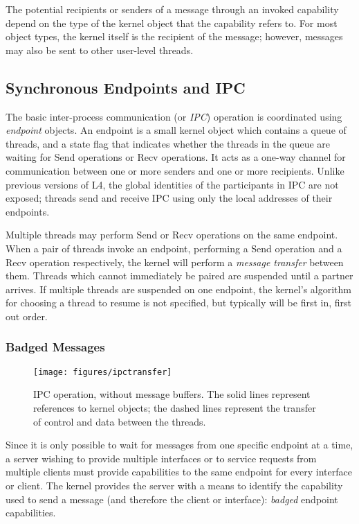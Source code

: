 The potential recipients or senders of a message through an invoked capability
depend on the type of the kernel object that the capability refers to. For
most object types, the kernel itself is the recipient of the message; however,
messages may also be sent to other user-level threads.

\subsection{Synchronous Endpoints and IPC}\label{sec:overview.caps.ipc}

The basic inter-process communication (or \emph{IPC}) operation is coordinated
using \emph{endpoint} objects. An endpoint is a small kernel object which
contains a queue of threads, and a state flag that indicates whether the
threads in the queue are waiting for Send operations or Recv operations. It
acts as a one-way channel for communication between one or more senders and
one or more recipients. Unlike previous versions of L4, the global identities
of the participants in IPC are not exposed; threads send and receive IPC using
only the local addresses of their endpoints.

Multiple threads may perform Send or Recv operations on the same endpoint.
When a pair of threads invoke an endpoint, performing a Send operation and a
Recv operation respectively, the kernel will perform a \emph{message transfer}
between them. Threads which cannot immediately be paired are suspended until a
partner arrives. If multiple threads are suspended on one endpoint, the
kernel's algorithm for choosing a thread to resume is not specified, but
typically will be first in, first out order.

\subsubsection{Badged Messages}

\begin{figure}
\centering \texttt{[image: figures/ipctransfer]}
\caption{IPC operation, without message buffers. The solid lines represent
references to kernel objects; the dashed lines represent the transfer of
control and data between the threads.}
\label{fig:ipctransfer}
\end{figure}

Since it is only possible to wait for messages from one specific endpoint at a
time, a server wishing to provide multiple interfaces or to service requests
from multiple clients must provide capabilities to the same endpoint for every
interface or client. The kernel provides the server with a means to identify
the capability used to send a message (and therefore the client or interface):
\emph{badged} endpoint capabilities.

